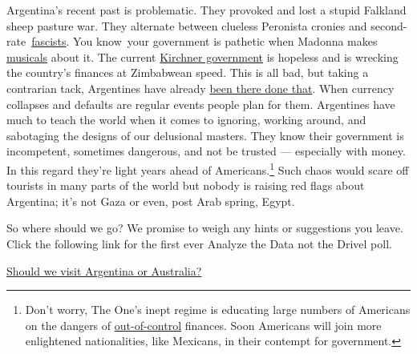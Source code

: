 Argentina's recent past is problematic. They provoked and lost a stupid
Falkland sheep pasture war. They alternate between clueless Peronista
cronies and
second-rate~\href{http://www.bbc.co.uk/news/world-latin-america-18731349}{fascists}.
You know~your government is pathetic when Madonna makes
\href{http://www.imdb.com/title/tt0116250/}{musicals} about it. The
current
\href{http://www.csmonitor.com/World/Americas/2012/1003/Argentina-Oil-nationalization-and-currency-controls-divide-a-nation}{Kirchner
government} is hopeless and is wrecking the country's finances at
Zimbabwean speed. This is all bad, but taking a contrarian tack,
Argentines have already
\href{http://www.efinancialnews.com/story/2011-07-25/history-of-debt-defaults-argentina-2001}{been
there done that}. When currency collapses and defaults are regular
events people plan for them. Argentines have much to teach the world
when it comes to ignoring, working around, and sabotaging the designs of
our delusional masters. They know their government is incompetent,
sometimes dangerous, and not be trusted --- especially with money. In
this regard they're light years ahead of
Americans.\footnote{
Don't worry, The One's inept regime is educating large numbers of
  Americans on the dangers of
  \href{http://www.usdebtclock.org/}{out-of-control} finances. Soon
  Americans will join more enlightened nationalities, like Mexicans, in
  their contempt for government.
} Such chaos would scare off
tourists in many parts of the world but nobody is raising red flags
about Argentina; it's not Gaza or even, post Arab spring, Egypt.

So where should we go? We promise to weigh any hints or suggestions you
leave. Click the following link for the first ever Analyze the Data not
the Drivel poll.

\href{http://polldaddy.com/poll/6805019/}{Should we visit Argentina or
Australia?}


%